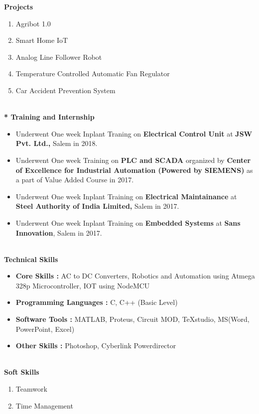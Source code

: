 \documentclass{article}
\begin{document}
	\begin{flushleft}
		\large \textbf{Projects}
		\begin{enumerate}
				\setlength\itemsep{0.01em}
			\item Agribot 1.0
			\item Smart Home IoT
			\item Analog Line Follower Robot
			\item Temperature Controlled Automatic Fan Regulator
			\item Car Accident Prevention System
		\end{enumerate}
		\large \textbf{\\* Training and Internship}\
		\begin{itemize}
			\setlength\itemsep{0.01em}
			\item Underwent One week Inplant Traning on \textbf{Electrical Control Unit} at \textbf{JSW Pvt. Ltd.,} Salem in 2018.
			\item Underwent One week Training on \textbf{PLC and SCADA} organized by \textbf{Center of Excellence for Industrial Automation (Powered by SIEMENS)} as a part of Value Added Course in 2017. 
			\item Underwent One week Inplant Training on \textbf{Electrical Maintainance} at \textbf{Steel Authority of India Limited,} Salem in 2017.
			\item Underwent One week Inplant Training on \textbf{Embedded Systems} at \textbf{Sans Innovation}, Salem in 2017. 
		\end{itemize}
		\large \textbf{\\Technical Skills}\
		\begin{itemize}
				\setlength\itemsep{0.01em}
			\item \textbf{Core Skills	:} AC to DC Converters,	Robotics and Automation using Atmega 328p Microcontroller, IOT using NodeMCU
			\item \textbf{Programming Languages	:}	C, C++ (Basic Level)
			\item \textbf{Software Tools	:}	MATLAB, Proteus, Circuit MOD, TeXstudio, MS(Word, PowerPoint, Excel)
			\item \textbf{Other Skills	:} Photoshop, Cyberlink Powerdirector
		\end{itemize}
		\large \textbf{\\Soft Skills}\
		\begin{enumerate}
				\setlength\itemsep{0.01em}
			\item Teamwork
			\item Time Management

\end{enumerate}
\end{flushleft}
\end{document}
